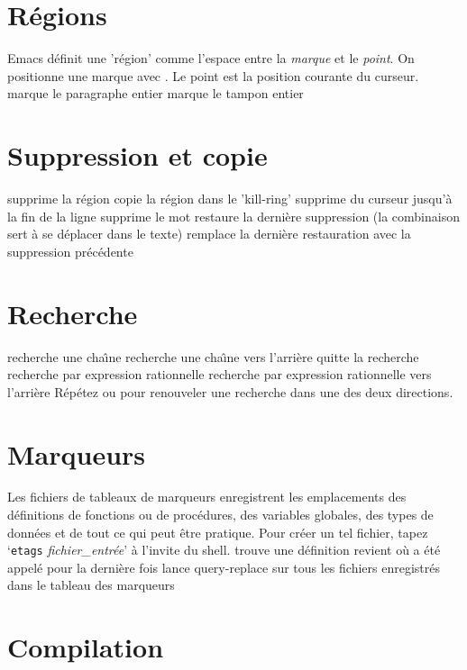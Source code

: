 \section{R\'egions}

Emacs d\'efinit une 'r\'egion' comme l'espace entre la {\it marque\/} et
le {\it point}. On positionne une marque avec .
Le point est la position courante du curseur.
\askip
{} marque le paragraphe entier
 marque le tampon entier

\section{Suppression et copie}

 supprime la r\'egion
 copie la r\'egion dans le 'kill-ring'
 supprime du curseur jusqu'\`a la fin de la ligne
 supprime le mot
 restaure la derni\`ere suppression (la combinaison  sert \`a se d\'eplacer dans le texte)
 remplace la derni\`ere restauration avec la suppression pr\'ec\'edente

\section{Recherche}

 recherche une cha\^\i{}ne
 recherche une cha\^\i{}ne vers l'arri\`ere
 quitte la recherche
 recherche par expression rationnelle
 recherche par expression rationnelle vers l'arri\`ere
\askip
R\'ep\'etez  ou  pour renouveler une recherche dans une
des deux directions.

\section{Marqueurs}

Les fichiers de tableaux de marqueurs enregistrent les emplacements des
d\'efinitions de fonctions ou de proc\'edures, des variables globales, des
types de donn\'ees et de tout ce qui peut \^etre pratique. Pour cr\'eer un
tel fichier, tapez `{\tt etags} {\it fichier\_entr\'ee}' \`a l'invite du shell.
\askip
{} trouve une d\'efinition
 revient o\`u  a \'et\'e appel\'e pour la derni\`ere fois
 lance query-replace sur tous les
fichiers enregistr\'es dans le tableau des marqueurs

\section{Compilation}

